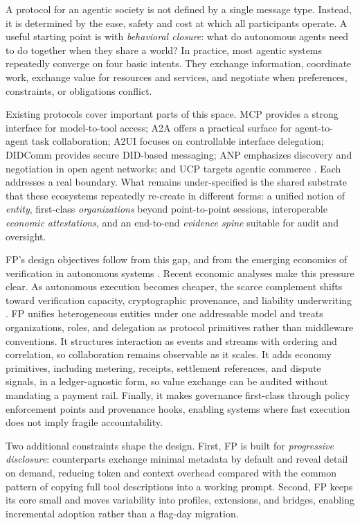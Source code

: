 \documentclass{foundationpaper}
\begin{document}
A protocol for an agentic society is not defined by a single message type. Instead, it is determined by the ease, safety and cost at which all participants operate. A useful starting point is with \emph{behavioral closure}: what do autonomous agents need to do together when they share a world? In practice, most agentic systems repeatedly converge on four basic intents. They exchange information, coordinate work, exchange value for resources and services, and negotiate when preferences, constraints, or obligations conflict.

Existing protocols cover important parts of this space. MCP provides a strong interface for model-to-tool access; A2A offers a practical surface for agent-to-agent task collaboration; A2UI focuses on controllable interface delegation; DIDComm provides secure DID-based messaging; ANP emphasizes discovery and negotiation in open agent networks; and UCP targets agentic commerce \cite{mcp_spec,a2a_spec,a2ui_spec,didcomm_spec,anp_paper,ucp_spec}. Each addresses a real boundary. What remains under-specified is the shared substrate that these ecosystems repeatedly re-create in different forms: a unified notion of \emph{entity}, first-class \emph{organizations} beyond point-to-point sessions, interoperable \emph{economic attestations}, and an end-to-end \emph{evidence spine} suitable for audit and oversight.

FP's design objectives follow from this gap, and from the emerging economics of verification in autonomous systems \cite{virtual_agent_economies}. 
Recent economic analyses make this pressure clear. As autonomous execution becomes cheaper, the scarce complement shifts toward verification capacity, cryptographic provenance, and liability underwriting \cite{agi_economics}.
FP unifies heterogeneous entities under one addressable model and treats organizations, roles, and delegation as protocol primitives rather than middleware conventions. It structures interaction as events and streams with ordering and correlation, so collaboration remains observable as it scales. It adds economy primitives, including metering, receipts, settlement references, and dispute signals, in a ledger-agnostic form, so value exchange can be audited without mandating a payment rail. Finally, it makes governance first-class through policy enforcement points and provenance hooks, enabling systems where fast execution does not imply fragile accountability.

Two additional constraints shape the design. First, FP is built for \emph{progressive disclosure}: counterparts exchange minimal metadata by default and reveal detail on demand, reducing token and context overhead compared with the common pattern of copying full tool descriptions into a working prompt. Second, FP keeps its core small and moves variability into profiles, extensions, and bridges, enabling incremental adoption rather than a flag-day migration.
\end{document}
